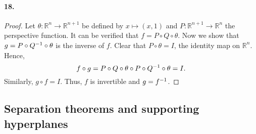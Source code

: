   \paragraph{18.}
  \begin{proof}
    Let $\theta:\mathbb{R}^n\to\mathbb{R}^{n+1}$ be defined by $x\mapsto (x,1)$
    and $P:\mathbb{R}^{n+1}\to\mathbb{R}^n$ the perspective function. It can be
    verified that $f=P\circ Q\circ\theta$. Now we show that $g=P\circ Q^{-1}
    \circ\theta$ is the inverse of $f$. Clear that $P\circ\theta=I$, the 
    identity map on $\mathbb{R}^n$. Hence,
    \[
      f\circ g=P\circ Q\circ\theta\circ P\circ Q^{-1}\circ\theta = I.
    \]
    Similarly, $g\circ f=I$. Thus, $f$ is invertible and $g=f^{-1}$.
  \end{proof}
\subsection{Separation theorems and supporting hyperplanes}
